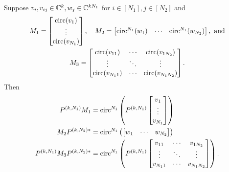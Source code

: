 \begin{lemma}
  Suppose $v_i, v_{ij} \in \mathbb{C}^k, w_j \in \mathbb{C}^{k N_1}$ for $i \in [N_1], j \in [N_2]$ and \begin{gather*} M_1 = \begin{bmatrix} \operatorname{circ}(v_1) \\ \vdots \\ \operatorname{circ}(v_{N_1}) \end{bmatrix},\quad M_2 = \begin{bmatrix} \operatorname{circ}^{N_1}(w_1) & \cdots & \operatorname{circ}^{N_1}(w_{N_2}) \end{bmatrix},\ \text{and} \\ M_3 = \begin{bmatrix} \operatorname{circ}(v_{11}) & \cdots & \operatorname{circ}(v_{1 N_2}) \\ \vdots & \ddots & \vdots \\ \operatorname{circ}(v_{N_1 1}) & \cdots & \operatorname{circ}(v_{N_1 N_2}) \end{bmatrix}.\end{gather*}  Then \begin{align} P^{(k, N_1)} M_1 &= \operatorname{circ}^{N_1}\left(P^{(k, N_1)} \begin{bmatrix} v_1 \\ \vdots \\ v_{N_1} \end{bmatrix}\right) \label{eq:M_1} \\ M_2 P^{(k, N_2)*} &= \operatorname{circ}^{N_1}\left(\begin{bmatrix} w_1 & \cdots & w_{N_2} \end{bmatrix}\right) \label{eq:M_2} \\ P^{(k, N_1)}M_3P^{(k, N_2)*} &= \operatorname{circ}^{N_1}\left(P^{(k, N_1)} \begin{bmatrix} v_{11} & \cdots & v_{1 N_2} \\ \vdots & \ddots & \vdots \\ v_{N_1 1} & \cdots & v_{N_1 N_2} \end{bmatrix}\right). \label{eq:M_3} \end{align} \label{lem:interleave}
\end{lemma}

